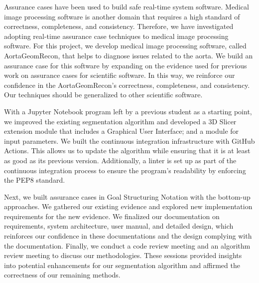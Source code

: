 
Assurance cases have been used to build safe real-time system software. Medical image processing software is another domain that requires a high standard of correctness, completeness, and consistency. Therefore, we have investigated adopting real-time assurance case techniques to medical image processing software. For this project, we develop medical image processing software, called AortaGeomRecon, that helps to diagnose issues related to the aorta. We build an assurance case for this software by expanding on the evidence used for previous work on assurance cases for scientific software. In this way, we reinforce our confidence in the AortaGeomRecon's correctness, completeness, and consistency. Our techniques should be generalized to other scientific software.

With a Jupyter Notebook program left by a previous student as a starting point, we improved the existing segmentation algorithm and developed a 3D Slicer extension module that includes a Graphical User Interface; and a module for input parameters. We built the continuous integration infrastructure with GitHub Actions. This allows us to update the algorithm while ensuring that it is at least as good as its previous version. Additionally, a linter is set up as part of the continuous integration process to ensure the program's readability by enforcing the PEP8 standard.

Next, we built assurance cases in Goal Structuring Notation with the bottom-up approaches. We gathered our existing evidence and explored new implementation requirements for the new evidence. We finalized our documentation on requirements, system architecture, user manual, and detailed design, which reinforces our confidence in these documentations and the design complying with the documentation. Finally, we conduct a code review meeting and an algorithm review meeting to discuss our methodologies. These sessions provided insights into potential enhancements for our segmentation algorithm and affirmed the correctness of our remaining methods.